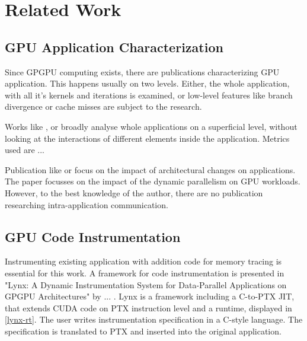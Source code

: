 \chapter{Related Work}
\section{GPU Application Characterization}
Since GPGPU computing exists, there are publications characterizing GPU application. This happens usually on
two levels. Either, the whole application, with all it's kernels and iterations is examined, or low-level 
features like branch divergence or cache misses are subject to the research.

Works like \cite{}, \cite{} or  \cite{} broadly analyse whole applications on a superficial level, without looking at the interactions of different elements inside the application. Metrics used are ...

Publication like \cite{} or \cite{} focus on the impact of architectural changes on applications. The paper \cite{} focusses on the impact of the dynamic parallelism on GPU workloads. 
However, to the best  knowledge of the author, there are no publication researching intra-application communication.
\section{GPU Code Instrumentation}
Instrumenting existing application with addition code for memory tracing is essential for this work.
A framework for code instrumentation is presented in "Lynx: A Dynamic Instrumentation System for Data-Parallel Applications on GPGPU Architectures" \cite{lynx} by ... . Lynx is a framework including a C-to-PTX JIT, that extends CUDA code on PTX instruction level and a runtime, displayed in \ref{lynx-rt}. The user writes instrumentation specification in a C-style language. The specification is translated to PTX and inserted into the original application.

